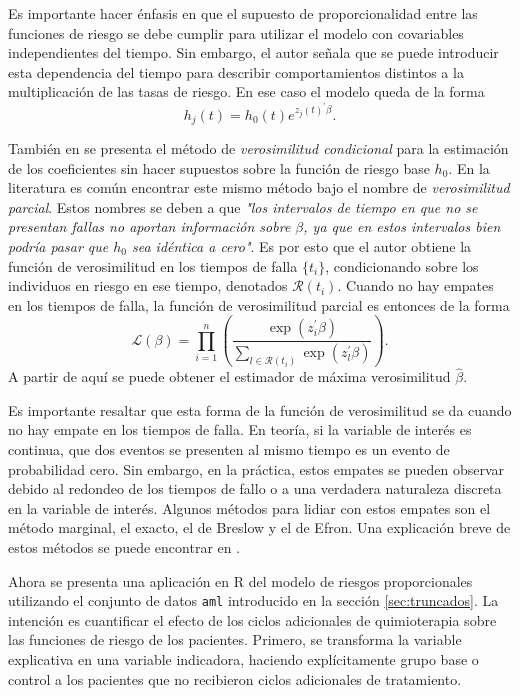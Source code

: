 \documentclass[11pt,a4paper]{article}
\begin{document}
Es importante hacer énfasis en que el supuesto de proporcionalidad entre las funciones de riesgo se debe cumplir para utilizar el modelo con covariables independientes del tiempo. Sin embargo, el autor señala que se puede introducir esta dependencia del tiempo para describir comportamientos distintos a la multiplicación de las tasas de riesgo. En ese caso el modelo queda de la forma
\begin{equation*}
h_j(t) = h_0(t)e^{z_j(t)^\prime \beta}.
\end{equation*}

También en \citet{cox} se presenta el método de \textit{verosimilitud condicional} para la estimación de los coeficientes sin hacer supuestos sobre la función de riesgo base $h_0$. En la literatura es común encontrar este mismo método bajo el nombre de \textit{verosimilitud parcial}. Estos nombres se deben a que \textit{"los intervalos de tiempo en que no se presentan fallas no aportan información sobre $\beta$, ya que en estos intervalos bien podría pasar que $h_0$ sea idéntica a cero"}. Es por esto que el autor obtiene la función de verosimilitud en los tiempos de falla $\lbrace t_{i} \rbrace$, condicionando sobre los individuos en riesgo en ese tiempo, denotados $\mathcal{R}(t_{i})$. Cuando no hay empates en los tiempos de falla, la función de verosimilitud parcial es entonces de la forma
$$\mathcal{L}(\beta) = \prod_{i=1}^n \left(\frac{\exp (z_i^\prime \beta)}{\sum_{l\in \mathcal{R}(t_{i})}\exp (z_l^\prime \beta)}\right).$$ A partir de aquí se puede obtener el estimador de máxima verosimilitud $\hat{\beta}$.

Es importante resaltar que esta forma de la función de verosimilitud se da cuando no hay empate en los tiempos de falla. En teoría, si la variable de interés es continua, que dos eventos se presenten al mismo tiempo es un evento de probabilidad cero. Sin embargo, en la práctica, estos empates se pueden observar debido al redondeo de los tiempos de fallo o a una verdadera naturaleza discreta en la variable de interés. Algunos métodos para lidiar con estos empates son el método marginal, el exacto, el de Breslow y el de Efron. Una explicación breve de estos métodos se puede encontrar en \citet{moore}.

Ahora se presenta una aplicación en R del modelo de riesgos proporcionales utilizando el conjunto de datos \texttt{aml} introducido en la sección \ref{sec:truncados}. La intención es cuantificar el efecto de los ciclos adicionales de quimioterapia sobre las funciones de riesgo de los pacientes. Primero, se transforma la variable explicativa en una variable indicadora, haciendo explícitamente grupo base o control a los pacientes que no recibieron ciclos adicionales de tratamiento.
\end{document}
